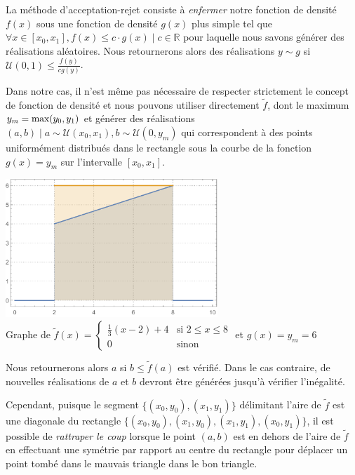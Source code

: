\documentclass[a4paper,11pt]{report}
\begin{document}
\begin{enumerate}[\indent a)]
La méthode d'acceptation-rejet consiste à \emph{enfermer} notre fonction de densité $f(x)$ sous une fonction de densité $g(x)$ plus simple tel que $\forall x \in [x_0,x_1], f(x) \leq c \cdot g(x) \mid c \in \mathbb{R}$ pour laquelle nous savons générer des réalisations aléatoires. Nous retournerons alors des réalisations $y \sim g$ si $\mathcal{U}(0,1) \leq \frac{f(y)}{cg(y)}$.

Dans notre cas, il n'est même pas nécessaire de respecter strictement le concept de fonction de densité et nous pouvons utiliser directement $\tilde{f}$, dont le maximum $y_m = \textnormal{max}(y_0, y_1)$ et générer des réalisations $(a,b) \mid a \sim \mathcal{U}(x_0, x_1), b \sim \mathcal{U}(0, y_m)$ qui correspondent à des points uniformément distribués dans le rectangle sous la courbe de la fonction $g(x)=y_m$ sur l'intervalle $[x_0, x_1]$.

\begin{center}
	\includegraphics[width=8cm]{img_graph3}\\
	{\footnotesize Graphe de $\tilde{f}(x) = \left\lbrace \begin{array}{ll}
		\frac{1}{3} ( x - 2 ) + 4 & \text{si $2 \leq x \leq 8$} \\
		0 						& \text{sinon}
		\end{array} \right.$ et $g(x)=y_m=6$}
\end{center}

Nous retournerons alors $a$ si $b \leq \tilde{f}(a)$ est vérifié. Dans le cas contraire, de nouvelles réalisations de $a$ et $b$ devront être générées jusqu'à vérifier l'inégalité.

Cependant, puisque le segment $\big\lbrace (x_0,y_0) , (x_1,y_1) \big\rbrace$ délimitant l'aire de $\tilde{f}$ est une diagonale du rectangle $\big\lbrace (x_0,y_0) , (x_1,y_0) , (x_1,y_1) , (x_0,y_1) \big\rbrace$, il est possible de \emph{rattraper le coup} lorsque le point $(a,b)$ est en dehors de l'aire de $\tilde{f}$ en effectuant une symétrie par rapport au centre du rectangle pour déplacer un point tombé dans le mauvais triangle dans le bon triangle.


\end{enumerate}
\end{document}
